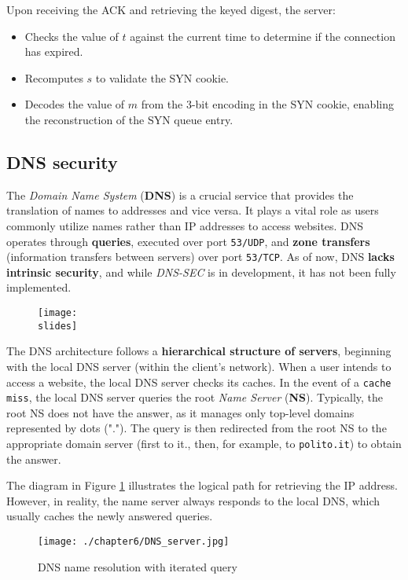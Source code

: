 Upon receiving the ACK and retrieving the keyed digest, the server:

\begin{itemize}
    \item Checks the value of $t$ against the current time to determine if the connection has expired.
    \item Recomputes $s$ to validate the SYN cookie.
    \item Decodes the value of $m$ from the 3-bit encoding in the SYN cookie, enabling the reconstruction of the SYN queue entry.
\end{itemize}


\subsection{DNS security}
The \textit{Domain Name System} (\textbf{DNS}) is a crucial service that provides the translation of names to addresses and vice versa. It plays a vital role as users commonly utilize names rather than IP addresses to access websites. DNS operates through \textbf{queries}, executed over port \texttt{53/UDP}, and \textbf{zone transfers} (information transfers between servers) over port \texttt{53/TCP}. As of now, DNS \textbf{lacks intrinsic security}, and while \textit{DNS-SEC} is in development, it has not been fully implemented.
\begin{figure}[h]
    \centering
    \texttt{[image: \\slides]}
\end{figure}

The DNS architecture follows a \textbf{hierarchical structure of servers}, beginning with the local DNS server (within the client's network). When a user intends to access a website, the local DNS server checks its caches. In the event of a \texttt{cache miss}, the local DNS server queries the root \textit{Name Server} (\textbf{NS}). Typically, the root NS does not have the answer, as it manages only top-level domains represented by dots ("."). The query is then redirected from the root NS to the appropriate domain server (first to it., then, for example, to \texttt{polito.it}) to obtain the answer.

The diagram in Figure \ref*{fig:DNS-server} illustrates the logical path for retrieving the IP address. However, in reality, the name server always responds to the local DNS, which usually caches the newly answered queries.

\begin{figure}[h]
    \centering
    \texttt{[image: ./chapter6/DNS\_server.jpg]}
    \caption{DNS name resolution with iterated query}
    \label{fig:DNS-server}
\end{figure}


